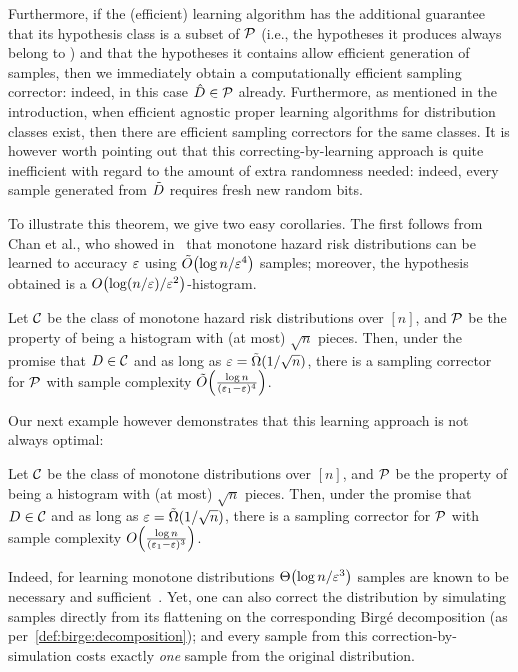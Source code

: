 Furthermore, if the (efficient) learning algorithm \Learner has the additional guarantee that its hypothesis class is a subset of $\mathcal{P}$ (i.e., the hypotheses it produces always belong to \property) and that the hypotheses it contains allow efficient generation of samples, then we immediately obtain a computationally efficient sampling corrector: indeed, in this case $\hat{D}\in\mathcal{P}$ already.
Furthermore, as mentioned in the introduction, when efficient agnostic proper learning algorithms for distribution classes exist, then there are efficient sampling correctors for the same classes.  It is however worth pointing out that this correcting-by-learning approach is quite inefficient with regard to the amount of extra randomness needed: indeed, every sample generated from $\tilde{D}$ requires fresh new random bits.

To illustrate this theorem, we give two easy corollaries. The first follows from Chan et al., who showed in~\cite{CDSS:13} that monotone hazard risk distributions can be learned to accuracy $\varepsilon$ using $\tildeO{{\log n}/{\eps^4}}$ samples; moreover, the hypothesis obtained is a $\bigO{\log (n/\eps)/\eps^2}$-histogram.
\begin{corollary}
Let $\mathcal{C}$ be the class of monotone hazard risk distributions over $[n]$, and $\mathcal{P}$ be the property of being
a histogram with (at most) $\sqrt{n}$ pieces. Then, under the promise that 
$D\in\mathcal{C}$ and as long as $\varepsilon=\tilde{\Omega}(1/\sqrt{n})$, there is a sampling corrector for $\mathcal{P}$ with sample complexity $\tildeO{\frac{\log n}{(\eps_1-\eps)^4}}$.
\end{corollary}
\noindent Our next example however demonstrates that this learning approach is not always optimal:
\begin{corollary}
Let $\mathcal{C}$ be the class of monotone distributions over $[n]$, and $\mathcal{P}$ be the property of being
a histogram with (at most) $\sqrt{n}$ pieces. Then, under the promise that 
$D\in\mathcal{C}$ and as long as $\varepsilon=\tilde{\Omega}(1/\sqrt{n})$, there is a sampling corrector for $\mathcal{P}$ with sample complexity $\bigO{\frac{\log n}{(\eps_1-\eps)^3}}$.
\end{corollary}
\noindent Indeed, for learning monotone distributions $\bigTheta{{\log n}/{\eps^3}}$ samples are known to be necessary and sufficient~\cite{Birge:87}. 
Yet, one can also correct the distribution by simulating samples directly from its flattening on the corresponding Birg\'e decomposition (as per~\cref{def:birge:decomposition}); and every sample from this correction-by-simulation costs exactly \emph{one} sample from the original distribution.

